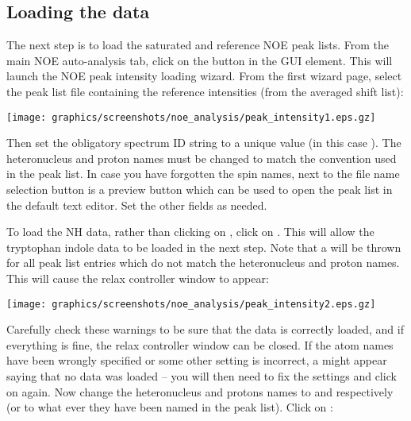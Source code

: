 
\subsection{Loading the data}

The next step is to load the saturated and reference NOE peak lists.  From the main NOE auto-analysis tab, click on the  button in the  GUI element.  This will launch the NOE peak intensity loading wizard.  From the first wizard page, select the peak list file containing the reference intensities (from the averaged shift list):

\begin{minipage}[h]{\linewidth}
\centerline{\texttt{[image: graphics/screenshots/noe\_analysis/peak\_intensity1.eps.gz]}}
\end{minipage}

Then set the obligatory spectrum ID string to a unique value (in this case ).  The heteronucleus and proton names must be changed to match the convention used in the peak list.  In case you have forgotten the spin names, next to the file name selection button is a preview button which can be used to open the peak list in the default text editor.  Set the other fields as needed.

To load the NH data, rather than clicking on , click on .  This will allow the tryptophan indole data to be loaded in the next step.  Note that a  will be thrown for all peak list entries which do not match the heteronucleus and proton names.  This will cause the relax controller window to appear:

\begin{minipage}[h]{\linewidth}
\centerline{\texttt{[image: graphics/screenshots/noe\_analysis/peak\_intensity2.eps.gz]}}
\end{minipage}

Carefully check these warnings to be sure that the data is correctly loaded, and if everything is fine, the relax controller window can be closed.  If the atom names have been wrongly specified or some other setting is incorrect, a  might appear saying that no data was loaded -- you will then need to fix the settings and click on  again.  Now change the heteronucleus and protons names to  and  respectively (or to what ever they have been named in the peak list).  Click on :

